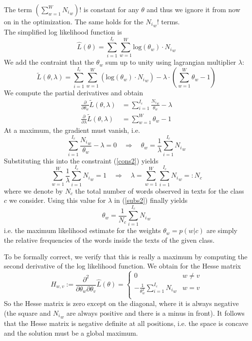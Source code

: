 \documentclass[%
   11pt,              %
   ngerman,           %
   a4paper,           %
   DIV11,             %
]{scrartcl}%
\begin{document}
The term $(\sum_{w=1}^W {N_i}_w)!$ is constant for any $\theta$ and thus we ignore it from now on in the optimization. The same holds for the ${N_i}_w !$ terms.\\
The simplified log likelihood function is
\begin{equation*}
	\hat{L}(\theta) = \sum_{i=1}^{I_c} \sum_{w=1}^W \text{log}(\theta_w) \cdot {N_i}_w
\end{equation*}
We add the contraint that the $\theta_w$ sum up to unity using lagrangian multiplier $\lambda$:
\begin{equation*}
	\tilde{L}(\theta, \lambda) = \sum_{i=1}^{I_c} \sum_{w=1}^W (\text{log}(\theta_w) \cdot {N_i}_w) - \lambda \cdot (\sum_{w=1}^W \theta_w - 1)
\end{equation*}
We compute the partial derivatives and obtain
\begin{align*}
	\frac{\partial}{\partial \theta_w} \tilde{L}(\theta, \lambda) &=  \sum_{i=1}^{I_c} \frac{{N_i}_w}{\theta_w} - \lambda\\
	\frac{\partial}{\partial \lambda} \tilde{L}(\theta, \lambda) &= \sum_{w=1}^W \theta_w - 1
\end{align*}
At a maximum, the gradient must vanish, i.e.
\begin{equation}\label{subs2}
	\sum_{i=1}^{I_c} \frac{{N_i}_w}{\theta_w} - \lambda = 0 \quad \Rightarrow \quad \theta_w = \frac{1}{\lambda} \sum_{i=1}^{I_c} {N_i}_w
\end{equation}
Substituting this into the constraint (\ref{cons2}) yields
\begin{equation*}
	\sum_{w=1}^W \frac{1}{\lambda} \sum_{i=1}^{I_c} {N_i}_w = 1 \quad \Rightarrow \quad \lambda = \sum_{w=1}^W \sum_{i=1}^{I_c} {N_i}_w =: N_c
\end{equation*}
where we denote by $N_c$ the total number of words observed in texts for the class $c$ we consider. Using this value for $\lambda$ in (\ref{subs2}) finally yields
\begin{equation*}
	\theta_w = \frac{1}{N_c} \sum_{i=1}^{I_c} {N_i}_w
\end{equation*}
i.e. the maximum likelihood estimate for the weights $\theta_w = p(w|c)$ are simply the relative frequencies of the words inside the texts of the given class. \par
To be formally correct, we verify that this is really a maximum by computing the second derivative of the log likelihood function. We obtain for the Hesse matrix
\begin{equation*}
	H_{w,v} := \frac{\partial^2}{\partial \theta_w \partial \theta_v} \hat{L}(\theta) = \begin{cases}
	0 & w \neq v \\
	- \frac{1}{\theta_w^2} \sum_{i=1}^{I_c} {N_i}_w & w = v \\ \end{cases}
\end{equation*}
So the Hesse matrix is zero except on the diagonal, where it is always negative (the square and ${N_i}_w$ are always positive and there is a minus in front). It follows that the Hesse matrix is negative definite at all positions, i.e. the space is concave and the solution must be a global maximum.
\end{document}
